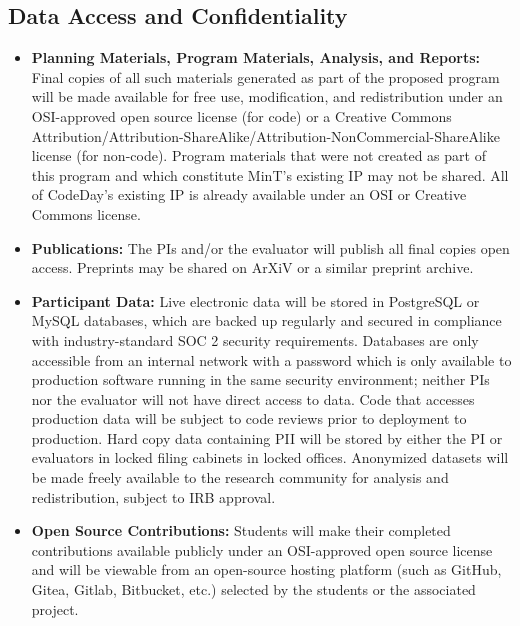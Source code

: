 \subsection{Data Access and Confidentiality}
\begin{itemize}
    \item \textbf{Planning Materials, Program Materials, Analysis, and Reports:} Final copies of all such materials generated as part of the proposed program will be made available for free use, modification, and redistribution under an OSI-approved open source license (for code) or a Creative Commons Attribution/Attribution-ShareAlike/Attribution-NonCommercial-ShareAlike license (for non-code). Program materials that were not created as part of this program and which constitute MinT's existing IP may not be shared. All of CodeDay's existing IP is already available under an OSI or Creative Commons license.

    \item \textbf{Publications:} The PIs and/or the evaluator will publish all final copies open access. Preprints may be shared on ArXiV or a similar preprint archive.
    
    \item \textbf{Participant Data:} Live electronic data will be stored in PostgreSQL or MySQL databases, which are backed up regularly and secured in compliance with industry-standard SOC 2 security requirements. Databases are only accessible from an internal network with a password which is only available to production software running in the same security environment; neither PIs nor the evaluator will not have direct access to data. Code that accesses production data will be subject to code reviews prior to deployment to production. Hard copy data containing PII will be stored by either the PI or evaluators in locked filing cabinets in locked offices. Anonymized datasets will be made freely available to the research community for analysis and redistribution, subject to IRB approval.

    \item \textbf{Open Source Contributions:} Students will make their completed contributions available publicly under an OSI-approved open source license and will be viewable from an open-source hosting platform (such as GitHub, Gitea, Gitlab, Bitbucket, etc.) selected by the students or the associated project.
\end{itemize}

